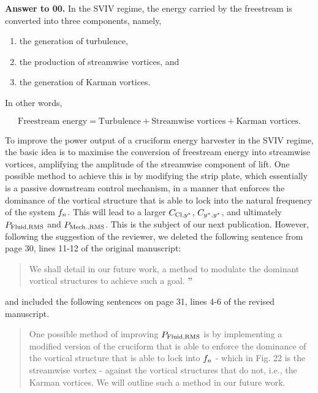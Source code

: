 \documentclass[10pt]{article}
\newcounter{question}
\newcommand{\name}{00}
\newcommand{\question}[1]{\refstepcounter{question} \noindent \textbf{Comment \name.\thequestion}\vskip 0.25cm \noindent \emph{#1}\\}
\newcommand{\answer}[1]{\noindent \textbf{Answer to \name.\thequestion}\vskip 0.25cm \noindent #1 \mbox{}\\}
\newcommand{\newperson}[2]{\renewcommand{\name}{#2} \setcounter{question}{0} \noindent \textbf{\large Answers to #1} \\}
\begin{document}
\answer{
  In the SVIV regime, the energy carried by the freestream is converted into three components, namely,

  \begin{enumerate}
    \item the generation of turbulence,
    \item the production of streamwise vortices, and
    \item the generation of Karman vortices.
  \end{enumerate}

  \noindent In other words,

  \begin{equation}
    \text{Freestream energy} = \text{Turbulence} + \text{Streamwise vortices} + \text{Karman vortices}.
    \label{eq:freesteamEnergy}
  \end{equation}
  
  \noindent To improve the power output of a cruciform energy harvester in the SVIV regime, the basic idea is to maximise the conversion of freestream energy into streamwise vortices, amplifying the \rms{} amplitude of the streamwise component of lift. One possible method to achieve this is by modifying the strip plate, which essentially is a passive downstream control mechanism, in a manner that enforces the dominance of the vortical structure that is able to lock into the natural frequency of the system $f_{n}$. This will lead to a larger $C_{\text{Cl},y^{*}}$, $C_{y^{*},y^{*}}$, and ultimately $P_{\text{Fluid,RMS}}$ and $P_{\text{Mech.,RMS}}$. This is the subject of our next publication. However, following the suggestion of the reviewer, we deleted the following sentence from page 30, lines 11-12 of the original manuscript:

  \begin{quotation}
    \noindent {\Large \textbf{``}} We shall detail in our future work, a method to modulate the dominant vortical structures to achieve such a goal. {\Large \textbf{''}}
  \end{quotation}

  \noindent and included the following sentences on page 31, lines 4-6  of the revised manuscript.

  \begin{quotation}
    \color{blue}
    \noindent One possible method of improving $P_{\text{Fluid,RMS}}$ is by implementing a modified version of the cruciform that is able to enforce the dominance of the vortical structure that is able to lock into $f_{n}$ - which in Fig. 22 is the streamwise vortex - against the vortical structures that do not, i.e., the Karman vortices. We will outline such a method in our future work.
  \end{quotation}
  \color{black}
}
% 
% 
\newpage


\end{document}
